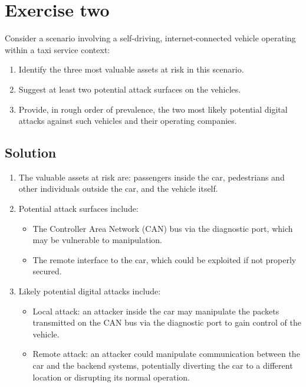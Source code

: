 \section{Exercise two}

Consider a scenario involving a self-driving, internet-connected vehicle operating within a taxi service context:
\begin{enumerate}
    \item Identify the three most valuable assets at risk in this scenario.
    \item Suggest at least two potential attack surfaces on the vehicles.
    \item Provide, in rough order of prevalence, the two most likely potential digital attacks against such vehicles and their operating companies.
\end{enumerate}

\subsection*{Solution}
\begin{enumerate}
    \item The valuable assets at risk are: passengers inside the car, pedestrians and other individuals outside the car, and the vehicle itself.
    \item Potential attack surfaces include:
        \begin{itemize}
            \item The Controller Area Network (CAN) bus via the diagnostic port, which may be vulnerable to manipulation.
            \item The remote interface to the car, which could be exploited if not properly secured.
        \end{itemize}
    \item Likely potential digital attacks include:
    \begin{itemize}
        \item Local attack: an attacker inside the car may manipulate the packets transmitted on the CAN bus via the diagnostic port to gain control of the vehicle.
        \item Remote attack: an attacker could manipulate communication between the car and the backend systems, potentially diverting the car to a different location or disrupting its normal operation.
        \end{itemize}
\end{enumerate}